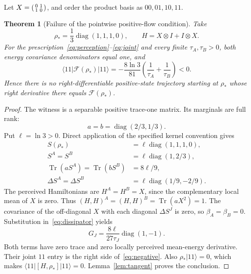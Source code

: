 \documentclass[11pt]{article}
\newtheorem{theorem}{Theorem}
\newcommand{\tr}{\operatorname{Tr}}
\newcommand{\diag}{\operatorname{diag}}
\begin{document}
Let $X=\begin{psmallmatrix}0&1\\1&0\end{psmallmatrix}$, and order the product basis as $00,01,10,11$.
\begin{theorem}[Failure of the pointwise positive-flow condition]\label{thm:witness}
Take
\begin{equation}
 \rho_*=\frac13\diag(1,1,1,0),\qquad H=X\otimes I+I\otimes X.\label{eq:witness}
\end{equation}
For the prescription~\eqref{eq:perception}--\eqref{eq:joint} and every finite $\tau_A,\tau_B>0$, both energy covariance denominators equal one, and
\begin{equation}
 \langle11|\mathcal F(\rho_*)|11\rangle
 =-\frac{8\ln3}{81}\left(\frac1{\tau_A}+\frac1{\tau_B}\right)<0.\label{eq:negative}
\end{equation}
Hence there is no right-differentiable positive-state trajectory starting at $\rho_*$ whose right derivative there equals $\mathcal F(\rho_*)$.
\end{theorem}
\begin{proof}
The witness is a separable positive trace-one matrix. Its marginals are full rank:
\begin{equation}
 a=b=\diag(2/3,1/3).
\end{equation}
Put $\ell=\ln3>0$. Direct application of the specified kernel convention gives
\begin{align}
 S(\rho_*)&=\ell\diag(1,1,1,0),\\
 S^A=S^B&=\ell\diag(1,2/3),\\
 \tr(aS^A)=\tr(bS^B)&=8\ell/9,\\
 \Delta S^A=\Delta S^B&=\ell\diag(1/9,-2/9).\label{eq:entropyvalues}
\end{align}
The perceived Hamiltonians are $H^A=H^B=X$, since the complementary local mean of $X$ is zero. Thus $(H,H)^A=(H,H)^B=\tr(aX^2)=1$. The covariance of the off-diagonal $X$ with each diagonal $\Delta S^J$ is zero, so $\beta_A=\beta_B=0$. Substitution in~\eqref{eq:dissipator} yields
\begin{equation}
 G_J=\frac{8\ell}{27\tau_J}\diag(1,-1).\label{eq:G}
\end{equation}
Both terms have zero trace and zero locally perceived mean-energy derivative. Their joint $11$ entry is the right side of~\eqref{eq:negative}. Also $\rho_*|11\rangle=0$, which makes $\langle11|[H,\rho_*]|11\rangle=0$. Lemma~\ref{lem:tangent} proves the conclusion.
\end{proof}
\end{document}
